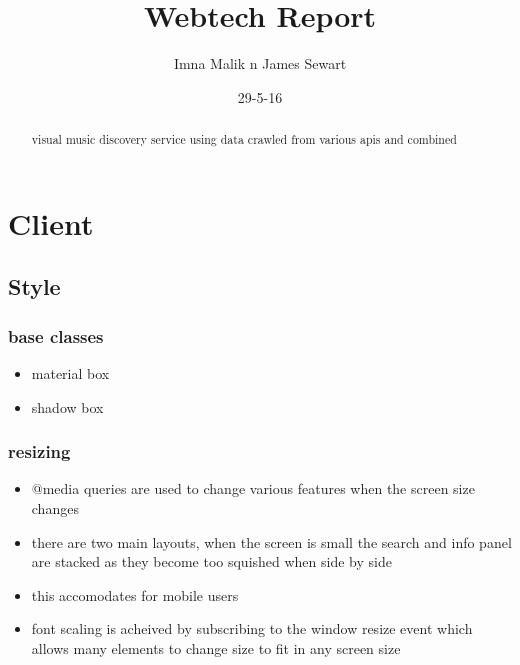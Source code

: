 \documentclass[10pt]{article}
\title{Webtech Report}
\author{Imna Malik n James Sewart}
\date{29-5-16}
\begin{document}
    \maketitle

    \tableofcontents


    \begin{abstract}
        visual music discovery service using data crawled from various apis and combined
    \end{abstract}



    \section{Client}
        \subsection{Style}
            \subsubsection{base classes}
                \begin{itemize}
                    \item material box
                    \item shadow box
                \end{itemize}

            \subsubsection{resizing}
                \begin{itemize}
                    \item @media queries are used to change various features when the screen size changes
                    \item there are two main layouts, when the screen is small the search and info panel are stacked as they become too squished when side by side
                    \item this accomodates for mobile users
                    \item font scaling is acheived by subscribing to the window resize event which allows many elements to change size to fit in any screen size
                \end{itemize}
\end{document}
